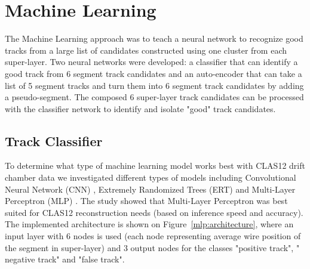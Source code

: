 \section{Machine Learning}

The Machine Learning approach was to teach a neural network to recognize good tracks
 from a large list of candidates constructed using one cluster from each super-layer.
 Two neural networks were developed: a classifier that can identify a good track from  6 segment
 track candidates  and an auto-encoder that can take a list of 5 segment tracks and turn them into 6 segment 
 track candidates by adding a pseudo-segment. The composed 6 super-layer track candidates 
 can be processed with the classifier network to identify and isolate "good" track candidates.

 
 \subsection{Track Classifier}
 
 To determine what type of machine learning model works best with CLAS12 drift chamber data we investigated different 
 types of models  \cite{Gavalian:2020oxg} including Convolutional Neural Network (CNN) , Extremely Randomized Trees (ERT) \cite{scikitlearn-extratreesclassifier} and 
 Multi-Layer Perceptron (MLP) \cite{scikitlearn-mlpclassifier}. The study showed that Multi-Layer Perceptron was best suited for 
 CLAS12 reconstruction needs (based on inference speed and accuracy). The implemented architecture is shown on 
 Figure~\ref{mlp:architecture}, where an input layer with 6 nodes is used (each node representing average wire position 
 of the segment in super-layer) and 3 output nodes for the classes "positive track", " negative track" and "false track".
 
